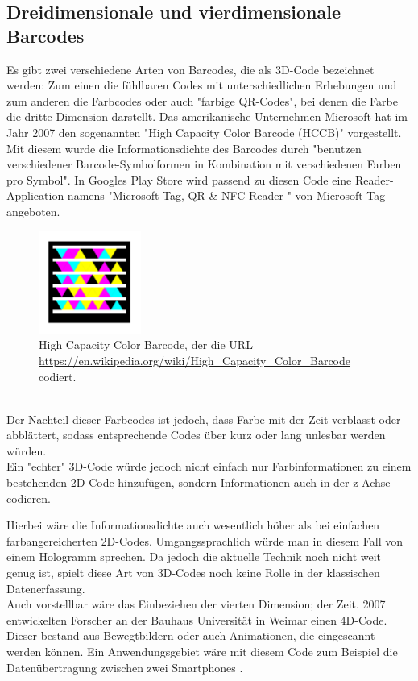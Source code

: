 \subsection{Dreidimensionale und vierdimensionale Barcodes}
Es gibt zwei verschiedene Arten von Barcodes, die als 3D-Code bezeichnet werden:
Zum einen die fühlbaren Codes mit unterschiedlichen Erhebungen und zum anderen die Farbcodes oder auch "farbige QR-Codes", bei denen die Farbe die dritte Dimension darstellt.
Das amerikanische Unternehmen Microsoft hat im Jahr 2007 den sogenannten "High Capacity Color Barcode (HCCB)" vorgestellt. Mit diesem wurde die Informationsdichte des Barcodes durch "benutzen verschiedener Barcode-Symbolformen in Kombination mit verschiedenen Farben pro Symbol"\cite{Paradiso2007}.
In Googles Play Store wird passend zu diesen Code eine Reader-Application namens "\href{https://play.google.com/store/apps/details?id=com.microsoft.tag.app.reader}{Microsoft Tag, QR \& NFC Reader} " von Microsoft Tag angeboten.
\begin{figure}[htbp]%
	\centering
	\includegraphics[width=0.3\textwidth]{Bilder/HCCB.png} 
	\vspace{-0.2cm}
	\caption[High Capacity Color Barcode]{High Capacity Color Barcode, der die URL \url{https://en.wikipedia.org/wiki/High_Capacity_Color_Barcode} codiert.\footnotemark}
	\label{fig:hccb}	
\end{figure}
~\\
Der Nachteil dieser Farbcodes ist jedoch, dass Farbe mit der Zeit verblasst oder abblättert, sodass entsprechende Codes über kurz oder lang unlesbar werden würden.\\
Ein "{}echter"{} 3D-Code würde jedoch nicht einfach nur Farbinformationen zu einem bestehenden 2D-Code hinzufügen, sondern Informationen auch in der z-Achse codieren. 

Hierbei wäre die Informationsdichte auch wesentlich höher als bei einfachen farbangereicherten 2D-Codes.  Umgangssprachlich würde man in diesem Fall von einem Hologramm sprechen. Da jedoch die aktuelle Technik noch nicht weit genug ist, spielt diese Art von 3D-Codes noch keine Rolle in der klassischen Datenerfassung. \cite{EtiscanGmbH2016}\\
Auch vorstellbar wäre das Einbeziehen der vierten Dimension; der Zeit. 2007 entwickelten Forscher an der Bauhaus Universität in Weimar einen 4D-Code. Dieser bestand aus Bewegtbildern oder auch Animationen, die eingescannt werden können. Ein Anwendungsgebiet wäre mit diesem Code zum Beispiel die Datenübertragung zwischen zwei Smartphones \cite{Unglaube2015}.

~\pagebreak
